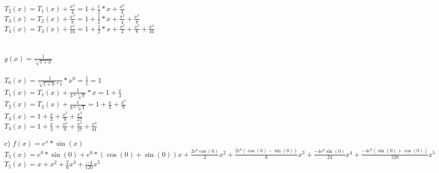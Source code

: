 \documentclass[a4paper,11pt,fleqn]{scrartcl}
\begin{document}
\begin{enumerate}
\begin{enumerate}
			$T_2(x)=T_1(x)+\frac{x^2}{4}=1+\frac{1}{2}*x+\frac{x^2}{4}$\\
			$T_3(x)=T_2(x)+\frac{x^3}{8}=1+\frac{1}{2}*x+\frac{x^2}{4}+\frac{x^3}{8}$\\
			$T_4(x)=T_3(x)+\frac{x^4}{16}=1+\frac{1}{2}*x+\frac{x^2}{4}+\frac{x^3}{8}+\frac{x^4}{16}$\\ \\ \\
			$g(x)=\frac{1}{\sqrt[3]{1+x}}$\\ \\
			$T_0(x)=\frac{1}{\sqrt[3]{1+0}*1}*x^0=\frac{1}{1}=1$\\
			$T_1(x)=T_1(x)+\frac{1}{3* \sqrt[3]{1}}*x=1+\frac{x}{3}$\\
			$T_2(x)=T_2(x)+\frac{1}{9* \sqrt[3]{1}}=1+\frac{x}{3}+\frac{x^2}{9}$\\
			$T_3(x)=1+\frac{x}{3}+\frac{x^2}{9}+\frac{x^3}{27}$\\
			$T_4(x)=1+\frac{x}{3}+\frac{x^2}{9}+\frac{x^3}{27}+\frac{x^4}{81}$\\
		\item[c)]
			$f(x)=e^x*\sin(x)$\\
			$T_5(x)={e^0*\sin(0)}+{e^0*(\cos(0)+\sin(0))}x+\frac{2e^0\cos(0)}{2}x^2+\frac{2e^0\left(\cos(0)-\sin(0)\right)}{6}x^3+\frac{-4e^0\sin(0)}{24}x^4+\frac{-4e^0\left(\sin(0)+\cos(0)\right)}{120}x^5$\\
			$T_5(x)=x+x^2+\frac{2}{6}x^3+\frac{-4}{120}x^5$\\
	\end{enumerate}


\end{enumerate}
\end{document}

